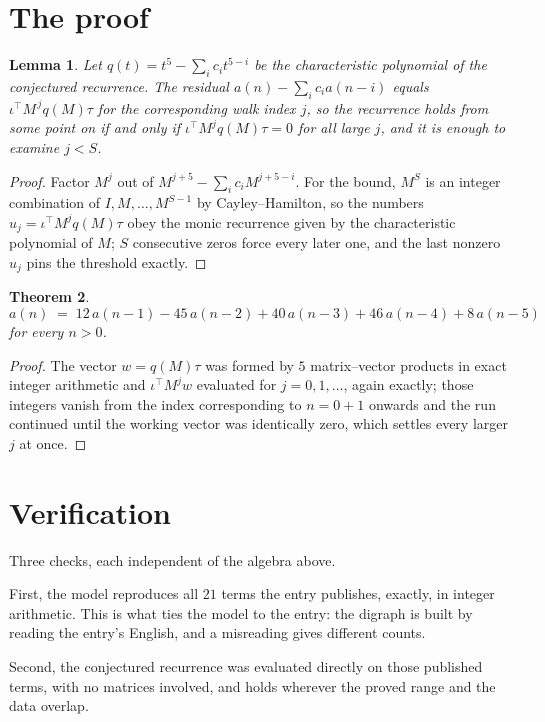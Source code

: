 \documentclass[11pt,a4paper]{article}
\theoremstyle{plain}
\newtheorem{theorem}{Theorem}
\newtheorem{lemma}[theorem]{Lemma}
\theoremstyle{definition}
\begin{document}
\section{The proof}

\begin{lemma}\label{lem:crit}
Let $q(t)=t^{5}-\sum_i c_it^{5-i}$ be the characteristic polynomial of the
conjectured recurrence. The residual $a(n)-\sum_ic_ia(n-i)$ equals
$\iota^{\!\top}M^{\,j}q(M)\tau$ for the corresponding walk index $j$, so the recurrence
holds from some point on if and only if $\iota^{\!\top}M^{j}q(M)\tau=0$ for all large $j$,
and it is enough to examine $j<S$.
\end{lemma}

\begin{proof}
Factor $M^{j}$ out of $M^{j+5}-\sum_ic_iM^{j+5-i}$. For the bound, $M^{S}$
is an integer combination of $I,M,\dots,M^{S-1}$ by Cayley--Hamilton, so the numbers
$u_j=\iota^{\!\top}M^{j}q(M)\tau$ obey the monic recurrence given by the characteristic
polynomial of $M$; $S$ consecutive zeros force every later one, and the last nonzero $u_j$
pins the threshold exactly.
\end{proof}

\begin{theorem}
\[
a(n)\;=\;12\,a(n-1) - 45\,a(n-2) + 40\,a(n-3) + 46\,a(n-4) + 8\,a(n-5)
\]
for every $n>0$.
\end{theorem}

\begin{proof}
The vector $w=q(M)\tau$ was formed by $5$ matrix--vector products in exact integer
arithmetic and $\iota^{\!\top}M^{j}w$ evaluated for $j=0,1,\dots$, again exactly; those
integers vanish from the index corresponding to $n=0+1$ onwards and the run continued
until the working vector was identically zero, which settles every larger $j$ at once.
\end{proof}

\section{Verification}

Three checks, each independent of the algebra above.

First, the model reproduces all $21$ terms the entry publishes, exactly, in integer
arithmetic. This is what ties the model to the entry: the digraph is built by reading the
entry's English, and a misreading gives different counts.

Second, the conjectured recurrence was evaluated directly on those published terms, with no
matrices involved, and holds wherever the proved range and the data overlap.
\end{document}
